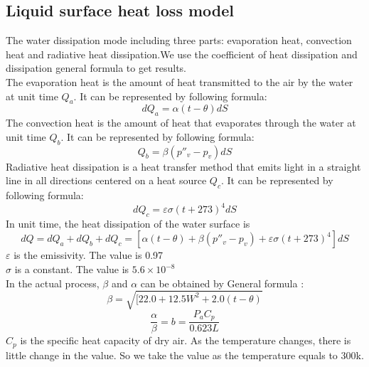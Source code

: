 \documentclass{mcmthesis}
\begin{document}
\subsection{Liquid surface heat loss model}
\indent The water dissipation mode including three parts: evaporation heat, convection heat and radiative heat dissipation.We use the coefficient of heat dissipation and dissipation general formula to get results.
\\
\indent The evaporation heat is the amount of heat transmitted to the air by the water at unit time $Q_{a}$. It can be represented by following formula:
\begin{equation}
	dQ_{a}=\alpha (t-\theta)dS
\end{equation}
\indent The convection heat is the amount of heat that evaporates through the water at unit time $Q_{b}$. It can be represented by following formula:
\begin{equation}
	Q_{b}=\beta ({p}''_{v}-p_{v})dS
\end{equation}
\indent Radiative heat dissipation is a heat transfer method that emits light in a straight line in all directions centered on a heat source $Q_{c}$.  It can be represented by following formula:
\begin{equation}
	dQ_{c}=\varepsilon \sigma (t+273)^{4}dS
\end{equation}
\indent In unit time, the heat dissipation of the water surface is \cite{1}
\begin{equation}
 dQ=dQ_{a}+dQ_{b}+dQ_{c}=[\alpha (t-\theta)+\beta ({p}''_{v}-p_{v})+\varepsilon \sigma (t+273)^{4}]dS 
\end{equation}
\indent \indent \indent $\varepsilon$ is the emissivity. The value is 0.97\\
\indent \indent \indent $\sigma$ is a constant. The value is $5.6\times 10^{-8}$\\
\indent \indent \indent In the actual process, $\beta$ and $\alpha$ can be obtained by General formula \cite{2}:\\
\begin{equation}
 \beta=\sqrt{[22.0+12.5W^{2}+2.0(t-\theta)}
\end{equation}
\begin{equation}
 \frac{\alpha}{\beta}=b=\frac{P_{a}C_{p}}{0.623L}
\end{equation}
\indent $C_{p}$ is the specific heat capacity of dry air. As the temperature changes, there is little change in the value. So we take the value as the temperature equals to 300k.\\
\end{document}
